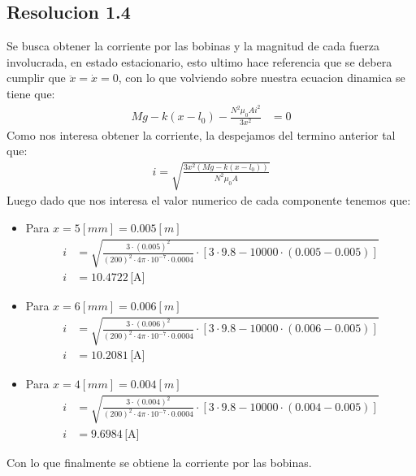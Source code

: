 \documentclass[
  11pt,
  letterpaper,
   addpoints,
   answers
  ]{exam}
\begin{document}
\begin{questions}
\begin{solution}
        \subsection*{Resolucion 1.4}
        Se busca obtener la corriente por las bobinas y la magnitud de cada fuerza involucrada, en estado estacionario, esto ultimo hace referencia que se debera cumplir que $\ddot{x}= \dot{x}=0$, con lo que volviendo sobre nuestra ecuacion dinamica se tiene que:
        \begin{align}
            Mg - k(x-l_{0}) - \frac{N^{2}\mu_{0}Ai^{2}}{3x^{2}} &= 0 
        \end{align}
        Como nos interesa obtener la corriente, la despejamos del termino anterior tal que:
        \begin{align}
            i = \sqrt{\frac{3x^{2}(Mg - k(x-l_{0}))}{N^{2}\mu_{0}A}}
        \end{align}
        Luego dado que nos interesa el valor numerico de cada componente tenemos que:
        \begin{itemize}
            \item Para $x = 5[mm] = 0.005[m]$
            \begin{align}
                i &= \sqrt{\frac{3 \cdot (0.005)^2}{(200)^2 \cdot 4\pi \cdot 10^{-7} \cdot 0.0004} \cdot \left[3 \cdot 9.8 - 10000 \cdot \left(0.005 - 0.005\right)\right]} \\
                i &= 10.4722 \, \text{[A]}
            \end{align}
            \item Para $x = 6[mm] = 0.006[m]$
            \begin{align}
                i &= \sqrt{\frac{3 \cdot (0.006)^2}{(200)^2 \cdot 4\pi \cdot 10^{-7} \cdot 0.0004} \cdot \left[3 \cdot 9.8 - 10000 \cdot \left(0.006 - 0.005\right)\right]} \\
                i &= 10.2081 \, \text{[A]}
            \end{align}
            \item Para $x = 4[mm] = 0.004[m]$
            \begin{align}
                i &= \sqrt{\frac{3 \cdot (0.004)^2}{(200)^2 \cdot 4\pi \cdot 10^{-7} \cdot 0.0004} \cdot \left[3 \cdot 9.8 - 10000 \cdot \left(0.004 - 0.005\right)\right]} \\
                i &= 9.6984 \, \text{[A]}
            \end{align}
        \end{itemize}
        Con lo que finalmente se obtiene la corriente por las bobinas.

\end{solution}
\end{questions}
\end{document}
